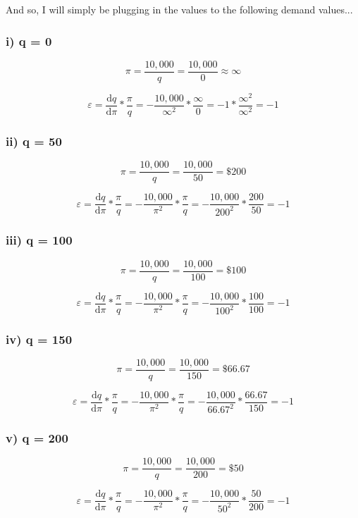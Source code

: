 \documentclass{article}
\begin{document}
And so, I will simply be plugging in the values to the following demand values...

\subsubsection{i) q = 0}
$$ \pi = \frac{10,000}{q} = \frac{10,000}{0} \approx \infty $$

$$ \varepsilon = \frac{\text{d}q}{\text{d}\pi}*\frac{\pi}{q} = -\frac{10,000}{\infty^2}*\frac{\infty}{0} = -1*\frac{\infty^2}{\infty^2} = -1$$

\subsubsection{ii) q = 50}
$$ \pi = \frac{10,000}{q} = \frac{10,000}{50} = \$200 $$

$$ \varepsilon = \frac{\text{d}q}{\text{d}\pi}*\frac{\pi}{q} = -\frac{10,000}{\pi^2}*\frac{\pi}{q} = -\frac{10,000}{200^2}*\frac{200}{50} = -1 $$

\subsubsection{iii) q = 100}
$$ \pi = \frac{10,000}{q} = \frac{10,000}{100} = \$100 $$

$$ \varepsilon = \frac{\text{d}q}{\text{d}\pi}*\frac{\pi}{q} =  -\frac{10,000}{\pi^2}*\frac{\pi}{q} = -\frac{10,000}{100^2}*\frac{100}{100} = -1$$

\subsubsection{iv) q = 150}
$$ \pi = \frac{10,000}{q} = \frac{10,000}{150} = \$66.67 $$

$$ \varepsilon = \frac{\text{d}q}{\text{d}\pi}*\frac{\pi}{q} = -\frac{10,000}{\pi^2}*\frac{\pi}{q} = -\frac{10,000}{66.67^2}*\frac{66.67}{150} = -1 $$

\subsubsection{v) q = 200}
$$ \pi = \frac{10,000}{q} = \frac{10,000}{200} = \$50 $$

$$ \varepsilon = \frac{\text{d}q}{\text{d}\pi}*\frac{\pi}{q} = -\frac{10,000}{\pi^2}*\frac{\pi}{q} = -\frac{10,000}{50^2}*\frac{50}{200} = -1 $$
\end{document}
